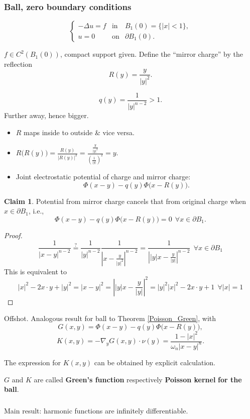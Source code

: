 \documentclass[12pt]{article}
\theoremstyle{definition}
\newtheorem*{claim*}{Claim}
\begin{document}
\subsubsection{Ball, zero boundary conditions}
\[\left\{\begin{array}{ccl}-\Delta u=f&\text{in}&B_1(0)=\{|x|<1\},\\u=0&\text{on}&\partial B_1(0).\end{array}\right.\]

$f\in C^2(B_1(0))$, compact support given. Define the ``mirror charge'' by the reflection
\[R(y)=\frac y{|y|^2}.\]

\[q(y)=\frac1{|y|^{n-2}}>1.\]
Further away, hence bigger.

\begin{itemize}
\item $R$ maps inside to outside \& vice versa.

\item $\displaystyle{R\big(R(y)\big)=\frac{R(y)}{\big|R(y)\big|^2}=\frac{\frac y{|y|^2}}{\left(\frac1{|y|}\right)^2}=y}$.

\item Joint electrostatic potential of charge and mirror charge:
\[\Phi(x-y)-q(y)\Phi\big(x-R(y)\big).\]
\end{itemize}

\begin{claim*}
Potential from mirror charge cancels that from original charge when $x\in\partial B_1$, i.e.,
\[\Phi(x-y)-q(y)\Phi\big(x-R(y)\big)=0\ \ \forall x\in\partial B_1.\]
\end{claim*}

\begin{proof}
\[\frac1{|x-y|^{n-2}}\overset?=\frac1{|y|^{n-2}}\frac1{\left|x-\frac y{|y|^2}\right|^{n-2}}=\frac1{\left||y|x-\frac y{|y|}\right|^{n-2}}\ \ \forall x\in\partial B_1\]
This is equivalent to
\[|x|^2-2x\cdot y+|y|^2=|x-y|^2=\left||y|x-\frac y{|y|}\right|^2=|y|^2|x|^2-2x\cdot y+1\ \ \forall|x|=1\]
\end{proof}
Offshot. Analogous result for ball to Theorem \ref{Poisson_Green}, with
\[G(x,y)=\Phi(x-y)-q(y)\Phi\big(x-R(y)\big),\]
\[K(x,y)=-\nabla_yG(x,y)\cdot\nu(y)=\frac{1-|x|^2}{\omega_n|x-y|^n}.\]

The expression for $K(x,y)$ can be obtained by explicit calculation.

$G$ and $K$ are called \textbf{Green's function} respectively \textbf{Poisson kernel} \textbf{for the ball}.

\subsubsection*{}
Main result: harmonic functions are infinitely differentiable.
\end{document}
